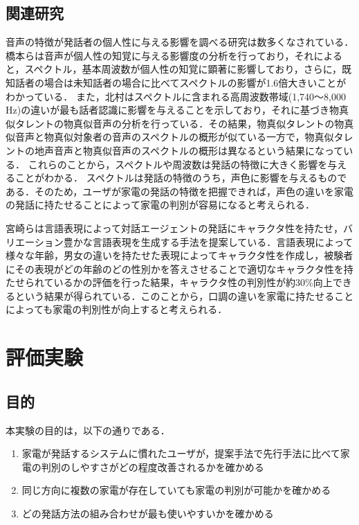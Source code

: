 \documentclass[a4j,12pt,twoside]{jreport}
\begin{document}
\section{関連研究}
音声の特徴が発話者の個人性に与える影響を調べる研究は数多くなされている．
橋本ら\cite{bunseki}は音声が個人性の知覚に与える影響度の分析を行っており，それによると，スペクトル，基本周波数が個人性の知覚に顕著に影響しており，さらに，既知話者の場合は未知話者の場合に比べてスペクトルの影響が1.6倍大きいことがわかっている．
また，北村\cite{seisei}はスペクトルに含まれる高周波数帯域(1,740〜8,000 Hz)の違いが最も話者認識に影響を与えることを示しており，それに基づき物真似タレントの物真似音声の分析を行っている．その結果，物真似タレントの物真似音声と物真似対象者の音声のスペクトルの概形が似ている一方で，物真似タレントの地声音声と物真似音声のスペクトルの概形は異なるという結果になっている．
これらのことから，スペクトルや周波数は発話の特徴に大きく影響を与えることがわかる．
スペクトルは発話の特徴のうち，声色に影響を与えるものである．そのため，ユーザが家電の発話の特徴を把握できれば，声色の違いを家電の発話に持たせることによって家電の判別が容易になると考えられる．

宮崎ら\cite{chara}は言語表現によって対話エージェントの発話にキャラクタ性を持たせ，バリエーション豊かな言語表現を生成する手法を提案している．言語表現によって様々な年齢，男女の違いを持たせた表現によってキャラクタ性を作成し，被験者にその表現がどの年齢のどの性別かを答えさせることで適切なキャラクタ性を持たせられているかの評価を行った結果，キャラクタ性の判別性が約30\%向上できるという結果が得られている．このことから，口調の違いを家電に持たせることによっても家電の判別性が向上すると考えられる．
\chapter{評価実験}

\section{目的}
本実験の目的は，以下の通りである．
\begin{enumerate}
	\item 家電が発話するシステムに慣れたユーザが，提案手法で先行手法に比べて家電の判別のしやすさがどの程度改善されるかを確かめる
	\item 同じ方向に複数の家電が存在していても家電の判別が可能かを確かめる
	\item どの発話方法の組み合わせが最も使いやすいかを確かめる
\end{enumerate}
\end{document}

